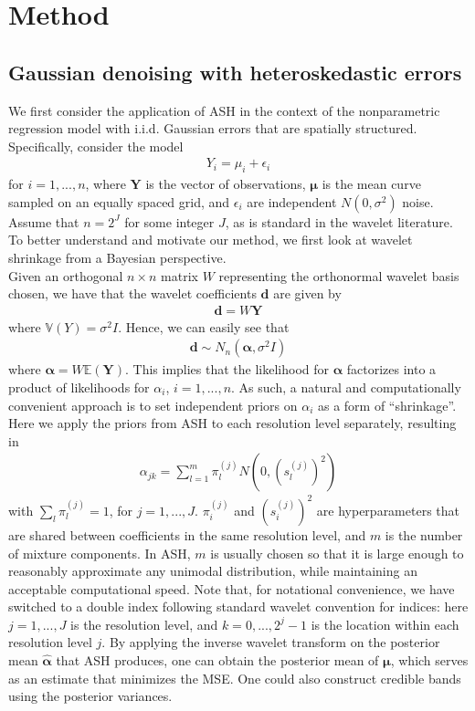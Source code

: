 \documentclass[12pt]{article}
\newcommand{\Ga}{\alpha}
\newcommand{\Ge}{\epsilon}
\newcommand{\s}{\sigma}
\begin{document}
\section{Method}
\subsection{Gaussian denoising with heteroskedastic errors}
We first consider the application of ASH in the context of the nonparametric regression model with i.i.d. Gaussian errors that are spatially structured. Specifically, consider the model
\begin{eqnarray}\label{eq:1d gaussian model}
Y_i=\mu_i+\Ge_i
\end{eqnarray}
for $i=1,...,n$, where $\bm{Y}$ is the vector of observations, $\bm{\mu}$ is the mean curve sampled on an equally spaced grid, and $\Ge_i$ are independent $N(0,\s^2)$ noise. Assume that $n=2^J$ for some integer $J$, as is standard in the wavelet literature. To better understand and motivate our method, we first look at wavelet shrinkage from a Bayesian perspective.\bigskip\\
Given an orthogonal $n\times n$ matrix $W$ representing the orthonormal wavelet basis chosen, we have that the wavelet coefficients $\bm{d}$ are given by
\begin{eqnarray}
\bm{d}=W\bm{Y}
\end{eqnarray}
where $\mathbb{V}(Y)=\s^2I$. Hence, we can easily see that
\begin{eqnarray}\label{eq:waveletcoef}
\bm{d}\sim N_n(\bm{\Ga},\s^2I)
\end{eqnarray}
where $\bm{\Ga}=W\mathbb{E}(\bm{Y})$. This implies that the likelihood for $\bm{\Ga}$ factorizes into a product of likelihoods for $\Ga_i$, $i=1,...,n$. As such, a natural and computationally convenient approach is to set independent priors on $\Ga_i$ as a form of ``shrinkage''. Here we apply the priors from ASH to each resolution level separately, resulting in
\begin{eqnarray}\label{eq:ashprior}
\Ga_{jk}=\sum_{l=1}^m \pi_l^{(j)} N(0,(s_l^{(j)})^2)
\end{eqnarray}
with $\sum_l \pi_l^{(j)}=1$, for $j=1,...,J$. $\pi_i^{(j)}$ and $(s_i^{(j)})^2$ are hyperparameters that are shared between coefficients in the same resolution level, and $m$ is the number of mixture components. In ASH, $m$ is usually chosen so that it is large enough to reasonably approximate any unimodal distribution, while maintaining an acceptable computational speed. Note that, for notational convenience, we have switched to a double index following standard wavelet convention for indices: here $j=1,...,J$ is the resolution level, and $k=0,...,2^j-1$ is the location within each resolution level $j$. By applying the inverse wavelet transform on the posterior mean $\hat{\bm{\Ga}}$ that ASH produces, one can obtain the posterior mean of $\bm{\mu}$, which serves as an estimate that minimizes the MSE. One could also construct credible bands using the posterior variances.\bigskip\\
\end{document}
